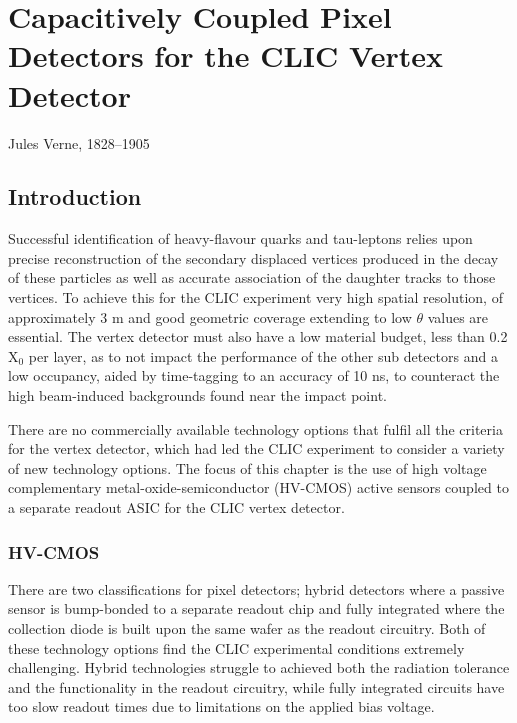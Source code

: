 \chapter{Capacitively Coupled Pixel Detectors for the CLIC Vertex Detector}
\label{chap:theory}

{Jules Verne, 1828--1905}


\section{Introduction}
Successful identification of heavy-flavour quarks and tau-leptons relies upon precise reconstruction of the secondary displaced vertices produced in the decay of these particles as well as accurate association of the daughter tracks to those vertices.  To achieve this for the CLIC experiment very high spatial resolution, of approximately 3 {\mu}m and good geometric coverage extending to low $\theta$ values are essential.  The vertex detector must also have a low material budget, less than 0.2 $\text{X}_{0}$ per layer, as to not impact the performance of the other sub detectors and a low occupancy, aided by time-tagging to an accuracy of 10 ns, to counteract the high beam-induced backgrounds found near the impact point.  

There are no commercially available technology options that fulfil all the criteria for the vertex detector, which had led the CLIC experiment to consider a variety of new technology options.  The focus of this chapter is the use of high voltage complementary metal-oxide-semiconductor (HV-CMOS) active sensors coupled to a separate readout ASIC for the CLIC vertex detector.  



\subsection{HV-CMOS}
There are two classifications for pixel detectors; hybrid detectors where a passive sensor is bump-bonded to a separate readout chip and fully integrated where the collection diode is built upon the same wafer as the readout circuitry.  Both of these technology options find the CLIC experimental conditions extremely challenging.  Hybrid technologies struggle to achieved both the radiation tolerance and the functionality in the readout circuitry, while fully integrated circuits have too slow readout times due to limitations on the applied bias voltage.  


